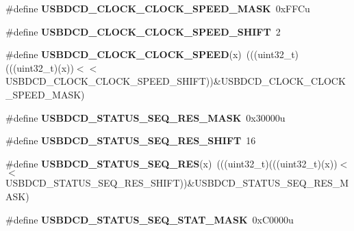\begin{DoxyCompactItemize}
\item 
\#define {\bfseries U\+S\+B\+D\+C\+D\+\_\+\+C\+L\+O\+C\+K\+\_\+\+C\+L\+O\+C\+K\+\_\+\+S\+P\+E\+E\+D\+\_\+\+M\+A\+SK}~0x\+F\+F\+Cu\hypertarget{group__USBDCD__Register__Masks_gaf53eaecf9a4de0251c8906350ac989ae}{}\label{group__USBDCD__Register__Masks_gaf53eaecf9a4de0251c8906350ac989ae}

\item 
\#define {\bfseries U\+S\+B\+D\+C\+D\+\_\+\+C\+L\+O\+C\+K\+\_\+\+C\+L\+O\+C\+K\+\_\+\+S\+P\+E\+E\+D\+\_\+\+S\+H\+I\+FT}~2\hypertarget{group__USBDCD__Register__Masks_gaa1667808247c5b8355c58b93a4e80c8a}{}\label{group__USBDCD__Register__Masks_gaa1667808247c5b8355c58b93a4e80c8a}

\item 
\#define {\bfseries U\+S\+B\+D\+C\+D\+\_\+\+C\+L\+O\+C\+K\+\_\+\+C\+L\+O\+C\+K\+\_\+\+S\+P\+E\+ED}(x)~(((uint32\+\_\+t)(((uint32\+\_\+t)(x))$<$$<$U\+S\+B\+D\+C\+D\+\_\+\+C\+L\+O\+C\+K\+\_\+\+C\+L\+O\+C\+K\+\_\+\+S\+P\+E\+E\+D\+\_\+\+S\+H\+I\+FT))\&U\+S\+B\+D\+C\+D\+\_\+\+C\+L\+O\+C\+K\+\_\+\+C\+L\+O\+C\+K\+\_\+\+S\+P\+E\+E\+D\+\_\+\+M\+A\+SK)\hypertarget{group__USBDCD__Register__Masks_gadaafc909e148543c71cfd927b757be98}{}\label{group__USBDCD__Register__Masks_gadaafc909e148543c71cfd927b757be98}

\item 
\#define {\bfseries U\+S\+B\+D\+C\+D\+\_\+\+S\+T\+A\+T\+U\+S\+\_\+\+S\+E\+Q\+\_\+\+R\+E\+S\+\_\+\+M\+A\+SK}~0x30000u\hypertarget{group__USBDCD__Register__Masks_gaa1c55980f5e31bfe02a2f4bc3bcf753d}{}\label{group__USBDCD__Register__Masks_gaa1c55980f5e31bfe02a2f4bc3bcf753d}

\item 
\#define {\bfseries U\+S\+B\+D\+C\+D\+\_\+\+S\+T\+A\+T\+U\+S\+\_\+\+S\+E\+Q\+\_\+\+R\+E\+S\+\_\+\+S\+H\+I\+FT}~16\hypertarget{group__USBDCD__Register__Masks_ga4d1d707ac9f9afb0b114a4032951971d}{}\label{group__USBDCD__Register__Masks_ga4d1d707ac9f9afb0b114a4032951971d}

\item 
\#define {\bfseries U\+S\+B\+D\+C\+D\+\_\+\+S\+T\+A\+T\+U\+S\+\_\+\+S\+E\+Q\+\_\+\+R\+ES}(x)~(((uint32\+\_\+t)(((uint32\+\_\+t)(x))$<$$<$U\+S\+B\+D\+C\+D\+\_\+\+S\+T\+A\+T\+U\+S\+\_\+\+S\+E\+Q\+\_\+\+R\+E\+S\+\_\+\+S\+H\+I\+FT))\&U\+S\+B\+D\+C\+D\+\_\+\+S\+T\+A\+T\+U\+S\+\_\+\+S\+E\+Q\+\_\+\+R\+E\+S\+\_\+\+M\+A\+SK)\hypertarget{group__USBDCD__Register__Masks_gaeec86c1cd7a042be608295688f38d243}{}\label{group__USBDCD__Register__Masks_gaeec86c1cd7a042be608295688f38d243}

\item 
\#define {\bfseries U\+S\+B\+D\+C\+D\+\_\+\+S\+T\+A\+T\+U\+S\+\_\+\+S\+E\+Q\+\_\+\+S\+T\+A\+T\+\_\+\+M\+A\+SK}~0x\+C0000u\hypertarget{group__USBDCD__Register__Masks_gad49d469540afee62a5a62a5419d89cf2}{}\label{group__USBDCD__Register__Masks_gad49d469540afee62a5a62a5419d89cf2}


\end{DoxyCompactItemize}
